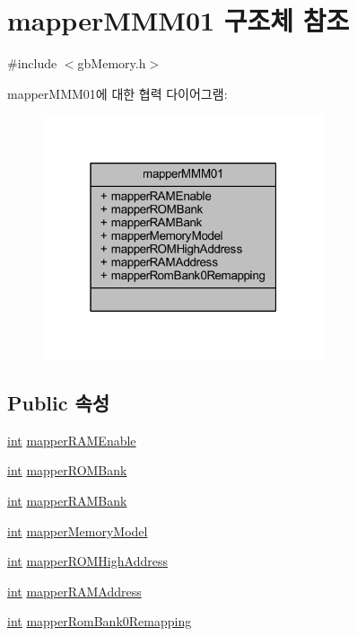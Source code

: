 \hypertarget{structmapper_m_m_m01}{}\section{mapper\+M\+M\+M01 구조체 참조}
\label{structmapper_m_m_m01}


{\ttfamily \#include $<$gb\+Memory.\+h$>$}



mapper\+M\+M\+M01에 대한 협력 다이어그램\+:\nopagebreak
\begin{figure}[H]
\begin{center}
\leavevmode
\includegraphics[width=235pt]{structmapper_m_m_m01__coll__graph}
\end{center}
\end{figure}
\subsection*{Public 속성}
\begin{DoxyCompactItemize}
\item 
\mbox{\hyperlink{_util_8cpp_a0ef32aa8672df19503a49fab2d0c8071}{int}} \mbox{\hyperlink{structmapper_m_m_m01_aa6b5a4c8f0ea53c5e2388f1feb168d4f}{mapper\+R\+A\+M\+Enable}}
\item 
\mbox{\hyperlink{_util_8cpp_a0ef32aa8672df19503a49fab2d0c8071}{int}} \mbox{\hyperlink{structmapper_m_m_m01_a3910af13771783e82d42fc1c9fe55157}{mapper\+R\+O\+M\+Bank}}
\item 
\mbox{\hyperlink{_util_8cpp_a0ef32aa8672df19503a49fab2d0c8071}{int}} \mbox{\hyperlink{structmapper_m_m_m01_a2f61701eeaa2c54843c49ea9a20a364c}{mapper\+R\+A\+M\+Bank}}
\item 
\mbox{\hyperlink{_util_8cpp_a0ef32aa8672df19503a49fab2d0c8071}{int}} \mbox{\hyperlink{structmapper_m_m_m01_a007dd4c2ddf664624e8d2fb89c132621}{mapper\+Memory\+Model}}
\item 
\mbox{\hyperlink{_util_8cpp_a0ef32aa8672df19503a49fab2d0c8071}{int}} \mbox{\hyperlink{structmapper_m_m_m01_a934a4728ec31f549910192215c163947}{mapper\+R\+O\+M\+High\+Address}}
\item 
\mbox{\hyperlink{_util_8cpp_a0ef32aa8672df19503a49fab2d0c8071}{int}} \mbox{\hyperlink{structmapper_m_m_m01_a582eba3e06837207223913c29d8e152d}{mapper\+R\+A\+M\+Address}}
\item 
\mbox{\hyperlink{_util_8cpp_a0ef32aa8672df19503a49fab2d0c8071}{int}} \mbox{\hyperlink{structmapper_m_m_m01_ad6ee8a3b9dbf7536cfb40081fad78a95}{mapper\+Rom\+Bank0\+Remapping}}
\end{DoxyCompactItemize}


